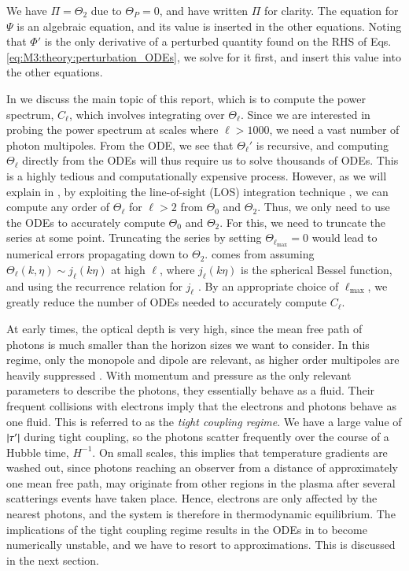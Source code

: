 We have $\Pi=\Theta_2$ due to $\Theta_P=0$, and have written $\Pi$ for clarity. The equation for $\Psi$ is an algebraic equation, and its value is inserted in the other equations. Noting that $\Phi'$ is the only derivative of a perturbed quantity found on the RHS of Eqs. \eqref{eq:M3:theory:perturbation_ODEs}, we solve for it first, and insert this value into the other equations. 

In  we discuss the main topic of this report, which is to compute the power spectrum, $C_\ell$, which involves integrating over $\Theta_\ell$. Since we are interested in probing the power spectrum at scales where $\ell>1000$, we need a vast number of photon multipoles. From the ODE, we see that $\Theta_\ell'$ is recursive, and computing $\Theta_\ell$ directly from the ODEs will thus require us to solve thousands of ODEs. This is a highly tedious and computationally expensive process. However, as we will explain in , by exploiting the line-of-sight (LOS) integration technique \cite{LOS_integration}, we can compute any order of $\Theta_\ell$ for $\ell>2$ from $\Theta_0$ and $\Theta_2$. Thus, we only need to use the ODEs to accurately compute $\Theta_0$ and $\Theta_2$. For this, we need to truncate the series at some point. Truncating the series by setting $\Theta_{\ell_\mathrm{max}}=0$ would lead to numerical errors propagating down to $\Theta_2$.  comes from assuming $\Theta_\ell(k,\eta)\sim j_\ell(k\eta)$ at high $\ell$, where $j_\ell(k\eta)$ is the spherical Bessel function, and using the recurrence relation for $j_\ell$ \citep[see][Eq. (46)-(49)]{callin}. By an appropriate choice of $\ell_\mathrm{max}$, we greatly reduce the number of ODEs needed to accurately compute $C_\ell$. 

At early times, the optical depth is very high, since the mean free path of photons is much smaller than the horizon sizes we want to consider. In this regime, only the monopole and dipole are relevant, as higher order multipoles are heavily suppressed \cite[Eq. (9.12)]{Dodelson}. With momentum and pressure as the only relevant parameters to describe the photons, they essentially behave as a fluid. Their frequent collisions with electrons imply that the electrons and photons behave as one fluid. This is referred to as the \textit{tight coupling regime}. We have a large value of $\abs{\tau'}$ during tight coupling, so the photons scatter frequently over the course of a Hubble time, $H^{-1}$. On small scales, this implies that temperature gradients are washed out, since photons reaching an observer from a distance of approximately one mean free path, may originate from other regions in the plasma after several scatterings events have taken place. Hence, electrons are only affected by the nearest photons, and the system is therefore in thermodynamic equilibrium. The implications of the tight coupling regime results in the ODEs in  to become numerically unstable, and we have to resort to approximations. This is discussed in the next section.    

